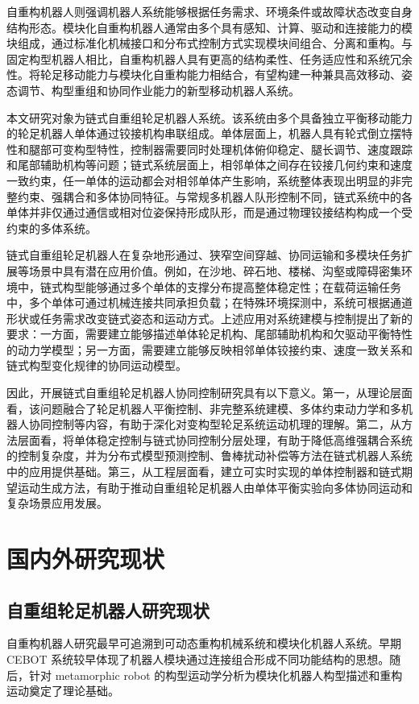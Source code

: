 \documentclass[type=bachelor]{bithesis}
\begin{document}
自重构机器人则强调机器人系统能够根据任务需求、环境条件或故障状态改变自身结构形态。模块化自重构机器人通常由多个具有感知、计算、驱动和连接能力的模块组成，通过标准化机械接口和分布式控制方式实现模块间组合、分离和重构\cite{fukuda1988dynamically,chirikjian1994kinematics,yim2000polybot,murata2002mtran,yim2007modular,murata2007self}。与固定构型机器人相比，自重构机器人具有更高的结构柔性、任务适应性和系统冗余性。将轮足移动能力与模块化自重构能力相结合，有望构建一种兼具高效移动、姿态调节、构型重组和协同作业能力的新型移动机器人系统。

本文研究对象为链式自重组轮足机器人系统。该系统由多个具备独立平衡移动能力的轮足机器人单体通过铰接机构串联组成。单体层面上，机器人具有轮式倒立摆特性和腿部可变构型特性，控制器需要同时处理机体俯仰稳定、腿长调节、速度跟踪和尾部辅助机构等问题；链式系统层面上，相邻单体之间存在铰接几何约束和速度一致约束，任一单体的运动都会对相邻单体产生影响，系统整体表现出明显的非完整约束、强耦合和多体协同特征。与常规多机器人队形控制不同，链式系统中的各单体并非仅通过通信或相对位姿保持形成队形，而是通过物理铰接结构构成一个受约束的多体系统。

链式自重组轮足机器人在复杂地形通过、狭窄空间穿越、协同运输和多模块任务扩展等场景中具有潜在应用价值。例如，在沙地、碎石地、楼梯、沟壑或障碍密集环境中，链式构型能够通过多个单体的支撑分布提高整体稳定性；在载荷运输任务中，多个单体可通过机械连接共同承担负载；在特殊环境探测中，系统可根据通道形状或任务需求改变链式姿态和运动方式。上述应用对系统建模与控制提出了新的要求：一方面，需要建立能够描述单体轮足机构、尾部辅助机构和欠驱动平衡特性的动力学模型；另一方面，需要建立能够反映相邻单体铰接约束、速度一致关系和链式构型变化规律的协同运动模型。



因此，开展链式自重组轮足机器人协同控制研究具有以下意义。第一，从理论层面看，该问题融合了轮足机器人平衡控制、非完整系统建模、多体约束动力学和多机器人协同控制等内容，有助于深化对变构型轮足系统运动机理的理解。第二，从方法层面看，将单体稳定控制与链式协同控制分层处理，有助于降低高维强耦合系统的控制复杂度，并为分布式模型预测控制、鲁棒扰动补偿等方法在链式机器人系统中的应用提供基础。第三，从工程层面看，建立可实时实现的单体控制器和链式期望运动生成方法，有助于推动自重组轮足机器人由单体平衡实验向多体协同运动和复杂场景应用发展。

\section{国内外研究现状}
\subsection{自重组轮足机器人研究现状}
自重构机器人研究最早可追溯到可动态重构机械系统和模块化机器人系统。早期 CEBOT 系统较早体现了机器人模块通过连接组合形成不同功能结构的思想\cite{fukuda1988dynamically}。随后，针对 metamorphic robot 的构型运动学分析为模块化机器人构型描述和重构运动奠定了理论基础\cite{chirikjian1994kinematics}。
\end{document}
